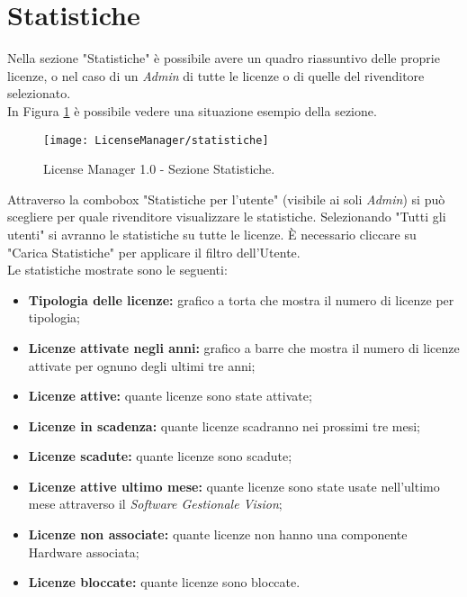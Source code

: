 \section{Statistiche}

Nella sezione "Statistiche" è possibile avere un quadro riassuntivo delle proprie licenze, o nel caso di un \textit{Admin} di tutte le licenze o di quelle del rivenditore selezionato.\\
In Figura \ref{stat} è possibile vedere una situazione esempio della sezione.


\begin{figure}[!h] 
    \centering 
    \texttt{[image: LicenseManager/statistiche]} 
    \caption{License Manager 1.0 - Sezione Statistiche.}
\label{stat}

\end{figure}

Attraverso la combobox "Statistiche per l’utente" (visibile ai soli \textit{Admin}) si può scegliere per quale rivenditore visualizzare le statistiche. Selezionando "Tutti gli utenti" si avranno le statistiche su tutte le licenze. È necessario cliccare su "Carica Statistiche" per applicare il filtro dell’Utente.\\
Le statistiche mostrate sono le seguenti:

\begin{itemize}

\item \textbf{Tipologia delle licenze:} grafico a torta che mostra il numero di licenze per tipologia;
\item \textbf{Licenze attivate negli anni:} grafico a barre che mostra il numero di licenze attivate per ognuno degli ultimi tre anni;
\item \textbf{Licenze attive:} quante licenze sono state attivate;
\item \textbf{Licenze in scadenza:} quante licenze scadranno nei prossimi tre mesi;
\item \textbf{Licenze scadute:} quante licenze sono scadute;
\item \textbf{Licenze attive ultimo mese:} quante licenze sono state usate nell’ultimo mese attraverso il \textit{Software Gestionale Vision};
\item \textbf{Licenze non associate:} quante licenze non hanno una componente Hardware associata;
\item \textbf{Licenze bloccate:} quante licenze sono bloccate.

\end{itemize}

